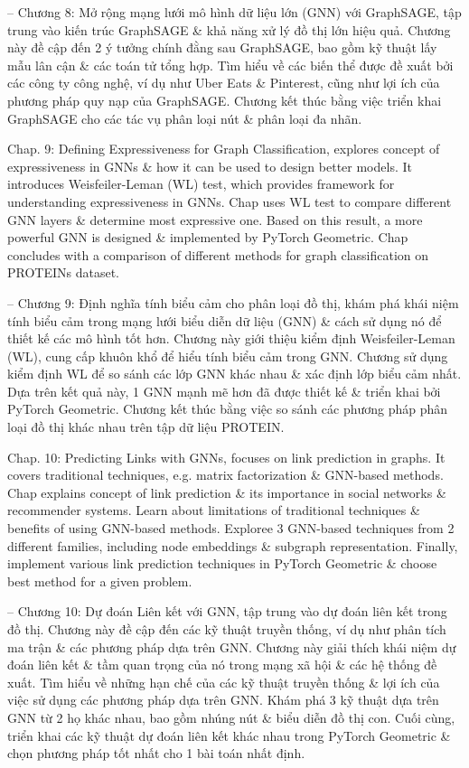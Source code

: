 \documentclass{article}
\begin{document}
\begin{itemize}
\begin{itemize}
        -- Chương 8: Mở rộng mạng lưới mô hình dữ liệu lớn (GNN) với GraphSAGE, tập trung vào kiến trúc GraphSAGE \& khả năng xử lý đồ thị lớn hiệu quả. Chương này đề cập đến 2 ý tưởng chính đằng sau GraphSAGE, bao gồm kỹ thuật lấy mẫu lân cận \& các toán tử tổng hợp. Tìm hiểu về các biến thể được đề xuất bởi các công ty công nghệ, ví dụ như Uber Eats \& Pinterest, cũng như lợi ích của phương pháp quy nạp của GraphSAGE. Chương kết thúc bằng việc triển khai GraphSAGE cho các tác vụ phân loại nút \& phân loại đa nhãn.

        Chap. 9: Defining Expressiveness for Graph Classification, explores concept of expressiveness in GNNs \& how it can be used to design better models. It introduces Weisfeiler-Leman (WL) test, which provides framework for understanding expressiveness in GNNs. Chap uses WL test to compare different GNN layers \& determine most expressive one. Based on this result, a more powerful GNN is designed \& implemented by PyTorch Geometric. Chap concludes with a comparison of different methods for graph classification on PROTEINs dataset.

        -- Chương 9: Định nghĩa tính biểu cảm cho phân loại đồ thị, khám phá khái niệm tính biểu cảm trong mạng lưới biểu diễn dữ liệu (GNN) \& cách sử dụng nó để thiết kế các mô hình tốt hơn. Chương này giới thiệu kiểm định Weisfeiler-Leman (WL), cung cấp khuôn khổ để hiểu tính biểu cảm trong GNN. Chương sử dụng kiểm định WL để so sánh các lớp GNN khác nhau \& xác định lớp biểu cảm nhất. Dựa trên kết quả này, 1 GNN mạnh mẽ hơn đã được thiết kế \& triển khai bởi PyTorch Geometric. Chương kết thúc bằng việc so sánh các phương pháp phân loại đồ thị khác nhau trên tập dữ liệu PROTEIN.

        Chap. 10: Predicting Links with GNNs, focuses on link prediction in graphs. It covers traditional techniques, e.g. matrix factorization \& GNN-based methods. Chap explains concept of link prediction \& its importance in social networks \& recommender systems. Learn about limitations of traditional techniques \& benefits of using GNN-based methods. Exploree 3 GNN-based techniques from 2 different families, including node embeddings \& subgraph representation. Finally, implement various link prediction techniques in PyTorch Geometric \& choose best method for a given problem.

        -- Chương 10: Dự đoán Liên kết với GNN, tập trung vào dự đoán liên kết trong đồ thị. Chương này đề cập đến các kỹ thuật truyền thống, ví dụ như phân tích ma trận \& các phương pháp dựa trên GNN. Chương này giải thích khái niệm dự đoán liên kết \& tầm quan trọng của nó trong mạng xã hội \& các hệ thống đề xuất. Tìm hiểu về những hạn chế của các kỹ thuật truyền thống \& lợi ích của việc sử dụng các phương pháp dựa trên GNN. Khám phá 3 kỹ thuật dựa trên GNN từ 2 họ khác nhau, bao gồm nhúng nút \& biểu diễn đồ thị con. Cuối cùng, triển khai các kỹ thuật dự đoán liên kết khác nhau trong PyTorch Geometric \& chọn phương pháp tốt nhất cho 1 bài toán nhất định.


\end{itemize}
\end{itemize}
\end{document}
